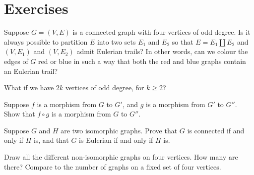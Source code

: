 \documentclass[nobib]{tufte-handout}
\begin{document}
\section{Exercises}

\begin{xca}
  Suppose $G = (V, E)$ is a connected graph with four vertices of odd degree. Is it always possible to partition $E$ into two sets $E_1$ and $E_2$ so that $E = E_1 \coprod E_2$ and $(V, E_1)$ and $(V,E_2)$ admit Eulerian trails? In other words, can we colour the edges of $G$ red or blue in such a way that both the red and blue graphs contain an Eulerian trail?

  What if we have $2k$ vertices of odd degree, for $k \geq 2$?
\end{xca}

\begin{xca}
  Suppose $f$ is a morphism from $G$ to $G'$, and $g$ is a morphism from $G'$ to $G''$. Show that $f \circ g$ is a morphism from $G$ to $G''$.
\end{xca}

\begin{xca}
  Suppose $G$ and $H$ are two isomorphic graphs. Prove that $G$ is connected if and only if $H$ is, and that $G$ is Eulerian if and only if $H$ is.
\end{xca}

\begin{xca}
  Draw all the different non-isomorphic graphs on four vertices. How many are there? Compare to the number of graphs on a fixed set of four vertices.
\end{xca}

%
%
\end{document}
